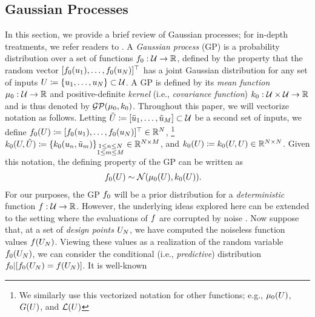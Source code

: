 \documentclass[12pt]{article}
\begin{document}
\subsection{Gaussian Processes}
In this section, we provide a brief review of Gaussian processes; for in-depth treatments, we refer readers to 
\cite{gramacy2020surrogates, StuartTeck2, gpML}. A \textit{Gaussian process} (GP) is a probability 
distribution over a set of functions $f_{0}: \mathcal{U} \to \mathbb{R}$, defined by the property that 
the random vector $[f_{0}(u_1), \dots, f_{0}(u_N)]^\top$ has
a joint Gaussian distribution for any set of inputs $U \coloneqq \{u_1, \dots, u_N\} \subset \mathcal{U}$. 
A GP is defined by its \textit{mean function} $\mu_0: \mathcal{U} \to \mathbb{R}$ and positive-definite \textit{kernel} 
(i.e., \textit{covariance function}) $k_0: \mathcal{U} \times \mathcal{U} \to \mathbb{R}$ and is thus denoted by 
$\mathcal{GP}(\mu_0, k_0)$. Throughout this paper, we will vectorize notation as follows. Letting 
$\tilde{U} \coloneqq [\tilde{u}_1, \dots, \tilde{u}_M]  \subset \mathcal{U}$ be a second set of inputs, we define 
$f_{0}(U) \coloneqq [f_{0}(u_1), \dots, f_{0}(u_N)]^\top \in \mathbb{R}^{N}$, 
\footnote{We similarly use this vectorized notation for other functions; e.g., $\mu_0(U)$, $G(U)$, and $\mathcal{L}(U)$}
$k_0(U, \tilde{U}) \coloneqq \{k_0(u_{n}, \tilde{u}_m)\}_{\substack{1 \leq n \leq N \\ 1 \leq m \leq M}} \in \mathbb{R}^{N \times M}$, 
and $k_0(U) \coloneqq k_0(U, U) \in \mathbb{R}^{N \times N}$. Given this notation, 
the defining property of the GP can be written as 
\begin{align}
f_{0}(U) &\sim \mathcal{N}(\mu_0(U), k_0(U)).
\end{align}
For our purposes, the GP $f_{0}$ will be a prior distribution for a \textit{deterministic} function $f: \mathcal{U} \to \mathbb{R}$. 
However, the underlying ideas explored here can be extended to the setting where the evaluations of $f$ 
are corrupted by noise \citep{VehtariParallelGP}. 
Now suppose that, at a set of \textit{design points} $U_{N}$, we have computed the noiseless function values
$f(U_{N})$. Viewing these values as a realization of the random variable $f_{0}(U_{N})$, we can 
consider the conditional (i.e., \textit{predictive}) distribution $f_{0}|[f_{0}(U_{N})=f(U_{N})]$. It is well-known
\end{document}
